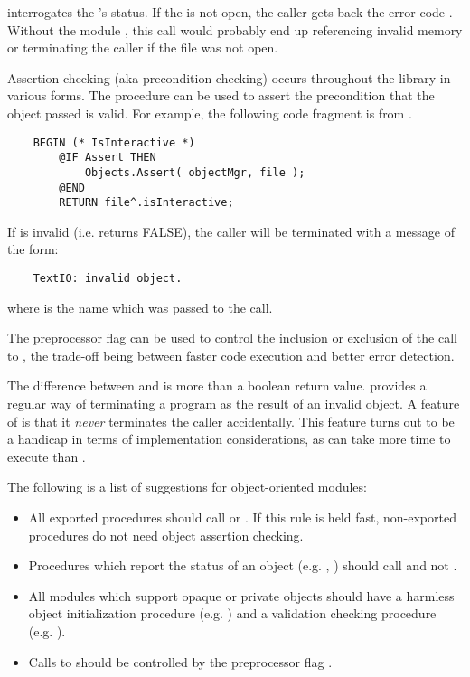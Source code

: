  interrogates the 's status.  If the
 is not open, the caller gets back the error code
.  Without the module ,
this call would probably end up referencing invalid memory
or terminating the caller if the file was not open.

Assertion checking (aka precondition checking) 
occurs throughout the library in various forms.  The procedure
 can be used to assert the precondition
that the object passed is valid.  For example, the following
code fragment is from .

\begin{verbatim}
    BEGIN (* IsInteractive *)
        @IF Assert THEN
            Objects.Assert( objectMgr, file );
        @END
        RETURN file^.isInteractive;
\end{verbatim}

If  is invalid (i.e.  returns FALSE),
the caller will be terminated with a message of the form:
\begin{verbatim}
    TextIO: invalid object.
\end{verbatim}
where  is the name which was passed to the 
call.

The preprocessor flag 
can be used to control the inclusion or exclusion of the call
to , the trade-off being between faster
code execution and better error detection.  


The difference between  and  is more
than a boolean return value.   provides a regular
way of terminating a program as the result of an invalid object.
A feature of  is that it {\em never} terminates
the caller accidentally.  This feature turns out to be a handicap
in terms of implementation considerations, as 
can take more time to execute than .

The following is a list of suggestions for object-oriented
modules:
\begin{itemize}
\item
    All exported procedures should call  or .
    If this rule is held fast, non-exported procedures do not need
    object assertion checking.
\item
    Procedures which report the status of an object (e.g. 
    , ) should call 
    and not .
\item
    All modules which support opaque or private objects should have
    a harmless object initialization procedure (e.g. 
    ) and a validation checking procedure
    (e.g. ).
\item
    Calls to  should be controlled by the preprocessor
    flag .
\end{itemize}

